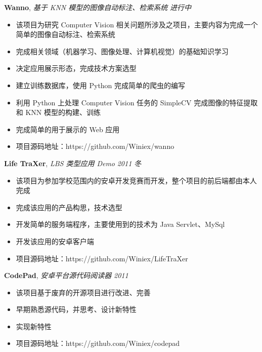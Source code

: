 \documentclass[9pt]{ctexart}
\newenvironment{changemargin}[2]{%
    \begin{list}{}{%
            \setlength{\topsep}{0pt}%
            \setlength{\leftmargin}{#1}%
            \setlength{\rightmargin}{#2}%
            \setlength{\listparindent}{\parindent}%
        \setlength{\itemindent}{\parindent}%
            \setlength{\parsep}{\parskip}%
        }%
  \item[]}{\end{list}
      }
\newenvironment{body} {
          \vspace*{-16pt}
          \begin{changemargin}{-0.25in}{-0.5in}
          }	
      {\end{changemargin}
      }
\begin{document}
      \begin{body}
          \vspace{14pt}
          \textbf{Wanno}, \emph{基于 KNN 模型的图像自动标注、检索系统} \hfill \emph{进行中}\\
          \vspace*{-4pt}
      \begin{itemize} \itemsep -0pt  %
              \item 该项目为研究 Computer Vision 相关问题所涉及之项目，主要内容为完成一个简单的图像自动标注、检索系统
              \item 完成相关领域（机器学习、图像处理、计算机视觉）的基础知识学习
              \item 决定应用展示形态，完成技术方案选型
              \item 建立训练数据库，使用 Python 完成简单的爬虫的编写
              \item 利用 Python 上处理 Computer Vision 任务的 SimpleCV 完成图像的特征提取和 KNN 模型的构建、训练
              \item 完成简单的用于展示的 Web 应用
              \item 项目源码地址：https://github.com/Winiex/wanno
          \end{itemize}

          \newpage

          \textbf{Life TraXer}, \emph{LBS 类型应用 Demo} \hfill \emph{2011 冬}\\
          \vspace*{-4pt}
      \begin{itemize} \itemsep -0pt  %
              \item 该项目为参加学校范围内的安卓开发竞赛而开发，整个项目的前后端都由本人完成
              \item 完成该应用的产品构思，技术选型
              \item 开发简单的服务端程序，主要使用到的技术为 Java Servlet、MySql
              \item 开发该应用的安卓客户端
              \item 项目源码地址：https://github.com/Winiex/LifeTraXer
          \end{itemize}

          \textbf {CodePad}, \emph{安卓平台源代码阅读器} \hfill \emph{2011}\\
          \vspace*{-4pt}
      \begin{itemize} \itemsep -0pt
              \item 该项目基于废弃的开源项目进行改进、完善
              \item 早期熟悉源代码，并思考、设计新特性
              \item 实现新特性
              \item 项目源码地址：https://github.com/Winiex/codepad
          \end{itemize}


\end{body}
\end{document}
